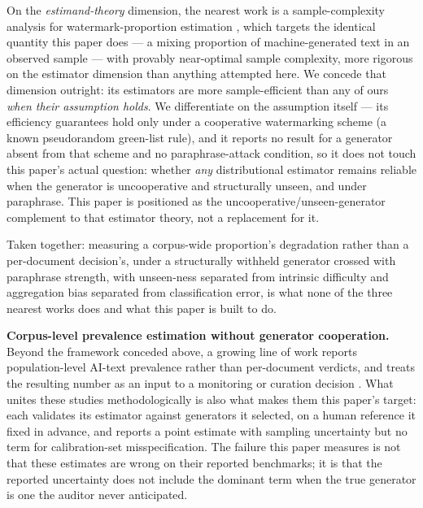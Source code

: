 \documentclass[11pt]{article}
\begin{document}
On the \emph{estimand-theory} dimension, the nearest work is a sample-complexity analysis for watermark-proportion estimation \citep{SampleComplexitiesofEsti700224}, which targets the identical quantity this paper does --- a mixing proportion of machine-generated text in an observed sample --- with provably near-optimal sample complexity, more rigorous on the estimator dimension than anything attempted here. We concede that dimension outright: its estimators are more sample-efficient than any of ours \emph{when their assumption holds}. We differentiate on the assumption itself --- its efficiency guarantees hold only under a cooperative watermarking scheme (a known pseudorandom green-list rule), and it reports no result for a generator absent from that scheme and no paraphrase-attack condition, so it does not touch this paper's actual question: whether \emph{any} distributional estimator remains reliable when the generator is uncooperative and structurally unseen, and under paraphrase. This paper is positioned as the uncooperative/unseen-generator complement to that estimator theory, not a replacement for it.

Taken together: measuring a corpus-wide proportion's degradation rather than a per-document decision's, under a structurally withheld generator crossed with paraphrase strength, with unseen-ness separated from intrinsic difficulty and aggregation bias separated from classification error, is what none of the three nearest works does and what this paper is built to do.

\textbf{Corpus-level prevalence estimation without generator cooperation.} Beyond the framework conceded above, a growing line of work reports population-level AI-text prevalence rather than per-document verdicts, and treats the resulting number as an input to a monitoring or curation decision \citep{MonitoringAIContent2024,MappingLLMUse2024}. What unites these studies methodologically is also what makes them this paper's target: each validates its estimator against generators it selected, on a human reference it fixed in advance, and reports a point estimate with sampling uncertainty but no term for calibration-set misspecification. The failure this paper measures is not that these estimates are wrong on their reported benchmarks; it is that the reported uncertainty does not include the dominant term when the true generator is one the auditor never anticipated.
\end{document}
